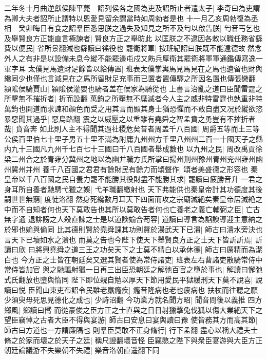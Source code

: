 二年冬十月曲逆獻侯陳平薨　詔列侯各之國為吏及詔所止者遣太子|{
	李奇曰為吏謂為卿大夫者詔所止謂特以恩愛見留余謂當時如周勃者是也}
十一月乙亥周勃復為丞相　癸卯晦日有食之詔羣臣悉思朕之過失及知見之所不及匄以啟告朕|{
	匄音丐乞也}
及舉賢良方正能直言極諫者|{
	賢良方正之舉昉此}
以匡朕之不逮因各敕以職任務省繇費以便民|{
	省所景翻減也繇讀曰徭役也}
罷衛將軍|{
	按班紀詔曰朕既不能遠德故然念外人之有非是以設備未息今縱不能罷邊屯戍又飭兵厚衛其罷衛將軍軍通鑑傳寫逸一軍字耳}
太僕見馬遺財足餘皆以給傳置|{
	班表太僕掌輿馬見馬見在之馬也遺留也財與纔同少也僅也言減見在之馬所留財足充事而已置者置傳驛之所因名置也傳張戀翻}
潁隂侯騎賈山|{
	潁隂侯灌嬰也騎者盖在侯家為騎從也}
上書言治亂之道曰臣聞雷霆之所擊無不摧折者|{
	折而設翻}
萬鈞之所壓無不糜滅者今人主之威非特雷霆也埶重非特萬鈞也開道而求諫和顔色而受之用其言而顯其身士猶恐懼而不敢自盡又况於縱欲恣暴惡聞其過乎|{
	惡烏路翻}
震之以威壓之以重雖有堯舜之智孟賁之勇豈有不摧折者哉|{
	賁音奔}
如此則人主不得聞其過社稷危矣昔者周盖千八百國|{
	周爵五等而土三等公侯百里伯七十里子男五十里不滿為附庸九州州方千里八州州二百一十國天子之縣内九十三國凡九州千七百七十三國曰千八百國者舉成數也}
以九州之民|{
	周改禹貢徐梁二州合之於青雍分冀州之地以為幽并職方氏所掌曰揚州荆州豫州青州兖州雍州幽州冀州并州}
養千八百國之君君有餘財民有餘力而頌聲作|{
	頌者美盛德之形容也}
秦皇帝以千八百國之民自養力罷不能勝其役財盡不能勝其求|{
	罷讀曰疲勝音升}
一君之身耳所自養者馳騁弋獵之娛|{
	弋羊職翻繳射也}
天下弗能供也秦皇帝計其功德度其後嗣世世無窮|{
	度徒洛翻}
然身死纔數月耳天下四面而攻之宗廟滅絶矣秦皇帝居滅絶之中而不自知者何也天下莫敢告也其所以莫敢告者何也亡養老之義亡輔弼之臣|{
	亡古無字通}
退誹謗之人殺直諫之士是以道諛媮合苟容|{
	道讀曰導言為諂諛導迎主意納之於邪也媮與偷同}
比其德則賢於堯舜課其功則賢於湯武天下已潰|{
	師古曰潰水旁決也言天下已壞如水之潰也}
而莫之告也今陛下使天下舉賢良方正之士天下皆訢訢焉|{
	訢讀曰欣}
曰將興堯舜之道三王之功矣天下之士莫不精白以承休德|{
	師古曰厲精而為潔白也}
今方正之士皆在朝廷矣又選其賢者使為常侍諸吏|{
	班表左右曹諸吏散騎常侍中常侍皆加官}
與之馳驅射獵一日再三出臣恐朝廷之解弛百官之墮於事也|{
	解讀曰懈弛式氏翻放也墮與惰同}
陛下即位親自勉以厚天下節用愛民平獄緩刑天下莫不說喜|{
	說讀曰悦}
臣聞山東吏布詔令民雖老羸癃疾|{
	癃音隆病也老也疲病也}
扶杖而往聽之願少須臾毋死思見德化之成也|{
	少詩沼翻}
今功業方就名聞方昭|{
	聞音問後以義推}
四方鄉風|{
	鄉讀曰嚮}
而從豪俊之臣方正之士直與之日日射獵擊兔伐狐以傷大業絶天下之望臣竊悼之古者大臣不得與宴游|{
	師古曰安息曰宴與讀曰豫}
使皆務其方而高其節|{
	師古曰方道也一方謂廉隅也}
則羣臣莫敢不正身脩行|{
	行下孟翻}
盡心以稱大禮夫士脩之於家而壞之於天子之廷|{
	稱尺證翻壞音怪}
臣竊愍之陛下與衆臣宴游與大臣方正朝廷論議游不失樂朝不失禮|{
	樂音洛朝直遥翻下同}
